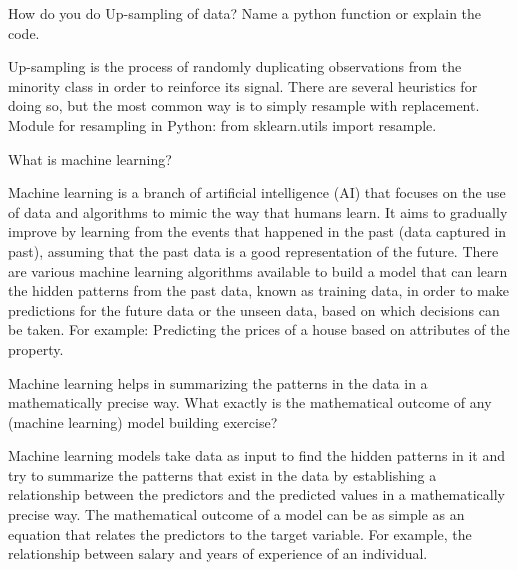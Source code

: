 	\begin{qanda}
		\begin{question}
How do you do Up-sampling of data? Name a python function or explain the code.
		\end{question}
		\begin{answer}
Up-sampling is the process of randomly duplicating observations from the minority class in order to reinforce its signal. There are several heuristics for doing so, but the most common way is to simply resample with replacement. Module for resampling in Python: from sklearn.utils import resample.
		\end{answer}
	\end{qanda}

	\begin{qanda}
		\begin{question}
What is machine learning?
		\end{question}
		\begin{answer}
Machine learning is a branch of artificial intelligence (AI) that focuses on the use of data and algorithms to mimic the way that humans learn. It aims to gradually improve by learning from the events that happened in the past (data captured in past), assuming that the past data is a good representation of the future. There are various machine learning algorithms available to build a model that can learn the hidden patterns from the past data, known as training data, in order to make predictions for the future data or the unseen data, based on which decisions can be taken. For example: Predicting the prices of a house based on attributes of the property.
		\end{answer}
	\end{qanda}

	\begin{qanda}
		\begin{question}
Machine learning helps in summarizing the patterns in the data in a mathematically precise way. What exactly is the mathematical outcome of any (machine learning) model building exercise?
		\end{question}
		\begin{answer}
Machine learning models take data as input to find the hidden patterns in it and try to summarize the patterns that exist in the data by establishing a relationship between the predictors and the predicted values in a mathematically precise way. The mathematical outcome of a model can be as simple as an equation that relates the predictors to the target variable. For example, the relationship between salary and years of experience of an individual.
		\end{answer}
	\end{qanda}

